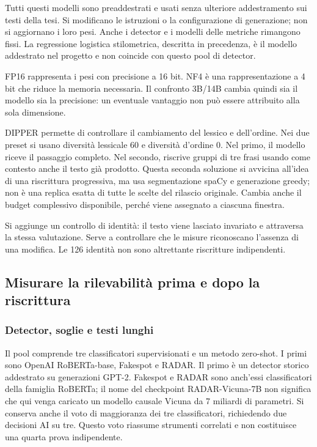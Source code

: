 \documentclass[11pt,a4paper]{article}
\begin{document}
Tutti questi modelli sono preaddestrati e usati senza ulteriore addestramento sui testi della tesi. Si modificano le istruzioni o la configurazione di generazione; non si aggiornano i loro pesi. Anche i detector e i modelli delle metriche rimangono fissi. La regressione logistica stilometrica, descritta in precedenza, è il modello addestrato nel progetto e non coincide con questo pool di detector.

FP16 rappresenta i pesi con precisione a 16 bit. NF4 è una rappresentazione a 4 bit che riduce la memoria necessaria. Il confronto 3B/14B cambia quindi sia il modello sia la precisione: un eventuale vantaggio non può essere attribuito alla sola dimensione.

DIPPER permette di controllare il cambiamento del lessico e dell'ordine. Nei due preset si usano diversità lessicale 60 e diversità d'ordine 0. Nel primo, il modello riceve il passaggio completo. Nel secondo, riscrive gruppi di tre frasi usando come contesto anche il testo già prodotto. Questa seconda soluzione si avvicina all'idea di una riscrittura progressiva, ma usa segmentazione spaCy e generazione greedy; non è una replica esatta di tutte le scelte del rilascio originale. Cambia anche il budget complessivo disponibile, perché viene assegnato a ciascuna finestra.

Si aggiunge un controllo di identità: il testo viene lasciato invariato e attraversa la stessa valutazione. Serve a controllare che le misure riconoscano l'assenza di una modifica. Le 126 identità non sono altrettante riscritture indipendenti.

\subsection{Misurare la rilevabilità prima e dopo la riscrittura}\label{misurare-la-rilevabilituxe0-prima-e-dopo-la-riscrittura}

\subsubsection{Detector, soglie e testi lunghi}\label{detector-soglie-e-testi-lunghi}

Il pool comprende tre classificatori supervisionati e un metodo zero-shot. I primi sono OpenAI RoBERTa-base, Fakespot e RADAR. Il primo è un detector storico addestrato su generazioni GPT-2. Fakespot e RADAR sono anch'essi classificatori della famiglia RoBERTa; il nome del checkpoint RADAR-Vicuna-7B non significa che qui venga caricato un modello causale Vicuna da 7 miliardi di parametri. Si conserva anche il voto di maggioranza dei tre classificatori, richiedendo due decisioni AI su tre. Questo voto riassume strumenti correlati e non costituisce una quarta prova indipendente.
\end{document}

